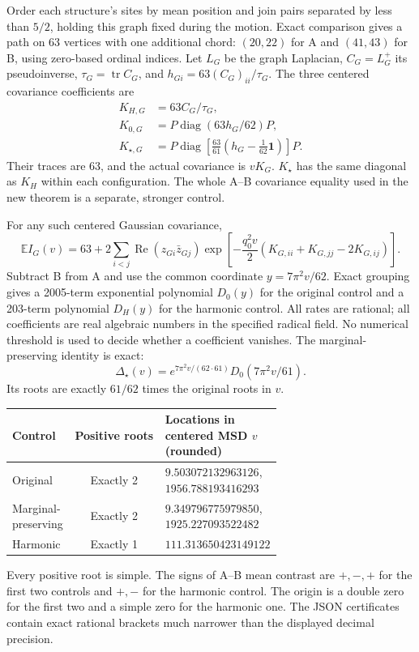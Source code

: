 \documentclass[11pt]{article}
\newcommand{\E}{\mathbb E}
\newcommand{\Ree}{\operatorname{Re}}
\newcommand{\one}{\mathbf1}
\begin{document}
Order each structure's sites by mean position and join pairs separated by less
than $5/2$, holding this graph fixed during the motion. Exact comparison gives a path on 63 vertices with one additional
chord: $(20,22)$ for A and $(41,43)$ for B, using zero-based ordinal indices.
Let $L_G$ be the graph Laplacian, $C_G=L_G^+$ its pseudoinverse,
$\tau_G=\operatorname{tr}C_G$, and
$h_{Gi}=63(C_G)_{ii}/\tau_G$. The three centered covariance coefficients are
\begin{align*}
 K_{H,G}&=63C_G/\tau_G,\\
 K_{0,G}&=P\operatorname{diag}(63h_G/62)P,\\
 K_{\star,G}&=P\operatorname{diag}\!\left[\frac{63}{61}
                   \left(h_G-\frac1{62}\one\right)\right]P.
\end{align*}
Their traces are 63, and the actual covariance is $vK_G$.
$K_\star$ has the same diagonal as $K_H$ within each configuration. The
whole A--B covariance equality used in the new theorem is a separate,
stronger control.

For any such centered Gaussian covariance,
\[
 \E I_G(v)=63+2\sum_{i<j}\Ree(z_{Gi}\bar z_{Gj})
 \exp\!\left[-\frac{q_0^2v}{2}
   (K_{G,ii}+K_{G,jj}-2K_{G,ij})\right].
\]
Subtract B from A and use the common coordinate
$y=7\pi^2v/62$. Exact grouping gives a 2005-term exponential polynomial
$D_0(y)$ for the original control and a 203-term polynomial $D_H(y)$ for
the harmonic control. All rates are rational; all coefficients are real
algebraic numbers in the specified radical field. No numerical threshold
is used to decide whether a coefficient vanishes.
The marginal-preserving identity is exact:
\begin{equation}\label{eq:star-transfer}
 \Delta_\star(v)=
 e^{7\pi^2v/(62\cdot61)}D_0(7\pi^2v/61).
\end{equation}
Its roots are exactly $61/62$ times the original roots in $v$.

\begin{center}
\begin{tabular}{p{0.23\linewidth}cp{0.43\linewidth}}
\toprule
Control & Positive roots & Locations in centered MSD $v$ (rounded)\\
\midrule
Original & Exactly 2 & $9.503072132963126$, $1956.788193416293$\\[3pt]
Marginal-preserving & Exactly 2 & $9.349796775979850$, $1925.227093522482$\\[3pt]
Harmonic & Exactly 1 & $111.313650423149122$\\
\bottomrule
\end{tabular}
\end{center}
Every positive root is simple. The signs of A--B mean contrast are $+,-,+$
for the first two controls and $+,-$ for the harmonic control. The origin
is a double zero for the first two and a simple zero for the harmonic one.
The JSON certificates contain exact rational brackets much narrower than
the displayed decimal precision.
\end{document}
